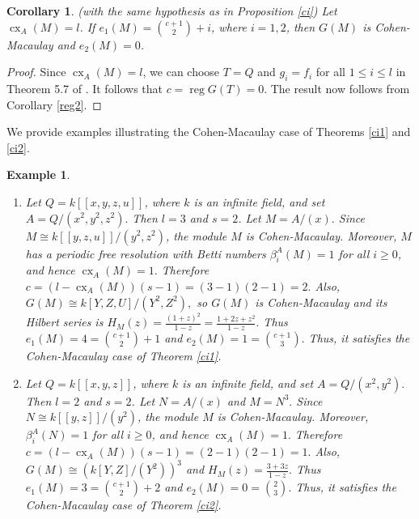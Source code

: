 \documentclass[11pt]{amsart}
\theoremstyle{plain}
\newtheorem{corollary}[theorem]{Corollary}
\newtheorem{example}[theorem]{Example}
\newcommand{\reg}{\operatorname{reg}}
\newcommand{\cx}{\operatorname{cx}}
\theoremstyle{plain}
\begin{document}
\begin{corollary}
    (with the same hypothesis as in Proposition \ref{ci}) Let $\cx_A(M)=l$. If $e_1(M)=\binom{c+1}{2}+i$, where $i=1,2$, then $G(M)$ is Cohen-Macaulay and $e_2(M)=0$. 
\end{corollary}

\begin{proof}
    Since $\cx_A(M)=l$, we can choose $T=Q$ and  $g_i=f_i$ for all $1\leq i\leq l$ in Theorem 5.7 of \cite{Quasipure}. It follows that $c=\reg G(T)=0$. The result now follows from Corollary \ref{reg2}.
\end{proof}

We provide examples illustrating the Cohen-Macaulay case of Theorems \ref{ci1} and \ref{ci2}.

\begin{example}
\begin{enumerate}
\normalfont
    \item Let $Q=k[[x,y,z,u]]$, where $k$ is an infinite field, and set $A=Q/(x^2,y^2,z^2).$ Then $l=3$ and $s=2$. Let
$M=A/(x).$ Since $M\cong k[[y,z,u]]/(y^2,z^2)$, the module $M$ is Cohen-Macaulay. Moreover, $M$ has a periodic free resolution with Betti numbers $\beta_i^A(M)=1$ for all $i\geq 0$, and hence
$\operatorname{cx}_A(M)=1.$ Therefore
$c=(l-\operatorname{cx}_A(M))(s-1)=(3-1)(2-1)=2.$ Also,
$G(M)\cong k[Y,Z,U]/(Y^2,Z^2),$ so $G(M)$ is Cohen-Macaulay and its Hilbert series is $\displaystyle H_M(z)=\frac{(1+z)^2}{1-z}=\frac{1+2z+z^2}{1-z}.$ Thus $e_1(M)=4=\binom{c+1}{2}+1$ and $e_2(M)=1=\binom{c+1}{3}.$ Thus, it satisfies the Cohen-Macaulay case of Theorem \ref{ci1}.

\item Let $Q=k[[x,y,z]]$, where $k$ is an infinite field, and set $A=Q/(x^2,y^2).$ Then $l=2$ and $s=2$. Let
$N=A/(x)$ and $M=N^{ 3}.$ Since $N\cong k[[y,z]]/(y^2)$, the module $M$ is Cohen-Macaulay. Moreover, $\beta_i^A(N)=1$ for all $i\geq0$, and hence $\operatorname{cx}_A(M)=1.$ Therefore
$c=(l-\operatorname{cx}_A(M))(s-1)=(2-1)(2-1)=1.$ Also,
$G(M)\cong (k[Y,Z]/(Y^2))^{3}$ and
$\displaystyle H_M(z)=\frac{3+3z}{1-z}.$ Thus
$e_1(M)=3=\binom{c+1}{2}+2$ and $e_2(M)=0=\binom{2}{3}.$ Thus, it satisfies the Cohen-Macaulay case of Theorem \ref{ci2}.
\end{enumerate}

\end{example}
\end{document}
